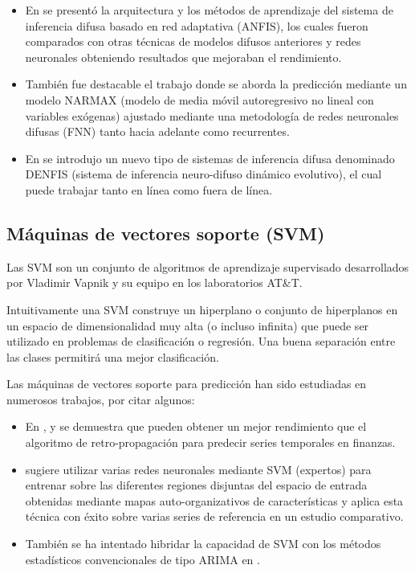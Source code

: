 \documentclass{llncs}
\begin{document}
\begin{itemize}

\item En \cite{jang1993anfis} se presentó la arquitectura y los métodos de aprendizaje del sistema de inferencia difusa basado en red adaptativa (ANFIS), los cuales fueron comparados con otras técnicas de modelos difusos anteriores y redes neuronales obteniendo resultados que mejoraban el rendimiento.

\item También fue destacable el trabajo \cite{gao2005narmax}  donde se aborda la predicción mediante un modelo NARMAX (modelo de media móvil autoregresivo no lineal con variables exógenas) ajustado mediante una metodología de redes neuronales difusas (FNN) tanto hacia adelante como recurrentes.

\item En \cite{kasabov2002denfis} se introdujo un nuevo tipo de sistemas de inferencia difusa denominado DENFIS (sistema de inferencia neuro-difuso dinámico evolutivo), el cual puede trabajar tanto en línea como fuera de línea.

\end{itemize}

\subsection{Máquinas de vectores soporte (SVM)}
Las SVM son un conjunto de algoritmos de aprendizaje supervisado desarrollados por Vladimir Vapnik y su equipo en los laboratorios AT\&T.

Intuitivamente una SVM construye un hiperplano o conjunto de hiperplanos en un espacio de dimensionalidad muy alta (o incluso infinita) que puede ser utilizado en problemas de clasificación o regresión. Una buena separación entre las clases permitirá una mejor clasificación.

Las máquinas de vectores soporte para predicción han sido estudiadas en numerosos trabajos, por citar algunos:
\begin{itemize}

\item En \cite{cao2003support}, \cite{Tay2001309} y \cite{kim2003financial} se demuestra que pueden obtener un mejor rendimiento que el algoritmo de retro-propagación para predecir series temporales en finanzas. 
\item \cite{Cao2003321} sugiere utilizar varias redes neuronales mediante SVM (expertos) para entrenar sobre las diferentes regiones disjuntas del espacio de entrada obtenidas mediante mapas auto-organizativos de características y aplica esta técnica con éxito sobre varias series de referencia en un estudio comparativo.
\item También se ha intentado hibridar la capacidad de SVM con los métodos estadísticos convencionales de tipo ARIMA en \cite{pai2005hybrid}.
 
\end{itemize}
\end{document}
